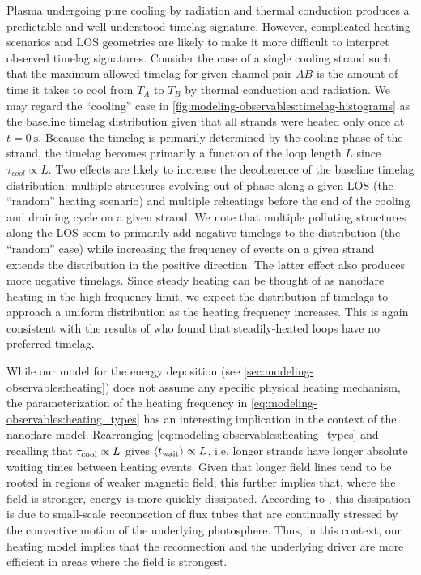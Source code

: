 Plasma undergoing pure cooling by radiation and thermal conduction produces a predictable and well-understood timelag signature. However, complicated heating scenarios and LOS geometries are likely to make it more difficult to interpret observed timelag signatures. Consider the case of a single cooling strand such that the maximum allowed timelag for given channel pair $AB$ is the amount of time it takes to cool from $T_A$ to $T_B$ by thermal conduction and radiation. We may regard the ``cooling'' case in \autoref{fig:modeling-observables:timelag-histograms} as the baseline timelag distribution given that all strands were heated only once at $t=\SI{0}{\second}$. Because the timelag is primarily determined by the cooling phase of the strand, the timelag becomes primarily a function of the loop length $L$ since $\tau_{cool}\propto L$. Two effects are likely to increase the decoherence of the baseline timelag distribution: multiple structures evolving out-of-phase along a given LOS (the ``random'' heating scenario) and multiple reheatings before the end of the cooling and draining cycle on a given strand. We note that multiple polluting structures along the LOS seem to primarily add negative timelags to the distribution (the ``random'' case) while increasing the frequency of events on a given strand extends the distribution in the positive direction. The latter effect also produces more negative timelags. Since steady heating can be thought of as nanoflare heating in the high-frequency limit, we expect the distribution of timelags to approach a uniform distribution as the heating frequency increases. This is again consistent with the results of \citet{viall_signatures_2016} who found that steadily-heated loops have no preferred timelag.

While our model for the energy deposition (see \autoref{sec:modeling-observables:heating}) does not assume any specific physical heating mechanism, the parameterization of the heating frequency in \autoref{eq:modeling-observables:heating_types} has an interesting implication in the context of the \citet{parker_nanoflares_1988} nanoflare model. Rearranging \autoref{eq:modeling-observables:heating_types} and recalling that $\tau_\textup{cool}\propto L$ gives $\langle t_{\textup{wait}}\rangle\propto L$, i.e. longer strands have longer absolute waiting times between heating events. Given that longer field lines tend to be rooted in regions of weaker magnetic field, this further implies that, where the field is stronger, energy is more quickly dissipated. According to \citet{parker_nanoflares_1988}, this dissipation is due to small-scale reconnection of flux tubes that are continually stressed by the convective motion of the underlying photosphere. Thus, in this context, our heating model implies that the reconnection and the underlying driver are more efficient in areas where the field is strongest.

